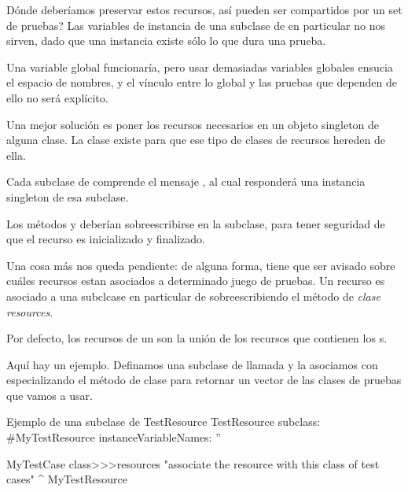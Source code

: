 \documentclass[a4paper,10pt,twoside]{book}
\begin{document}
D\'onde deber\'iamos preservar estos recursos, as\'i pueden ser compartidos por un set de pruebas?
Las variables de instancia de una subclase de  en particular no nos sirven, dado que una instancia
existe s\'olo lo que dura una prueba.

Una variable global funcionar\'ia, pero usar demasiadas variables globales ensucia el espacio de nombres,
y el v\'inculo entre lo global y las pruebas que dependen de ello no ser\'a expl\'icito. 

Una mejor soluci\'on es poner los recursos necesarios en un objeto singleton de alguna clase.
La clase  existe para que ese tipo de clases de recursos hereden de ella.

Cada subclase de   comprende el mensaje , al cual responder\'a una instancia singleton de esa subclase.

Los m\'etodos  y  deber\'ian sobreescribirse en la subclase, para tener seguridad de que el
recurso es inicializado y finalizado. 

Una cosa m\'as nos queda pendiente: de alguna forma, \sunit tiene que ser avisado sobre cu\'ales recursos
estan asociados a determinado juego de pruebas.
Un recurso es asociado a una subclcase en particular de  sobreescribiendo el m\'etodo de \emph{clase}
\emph{resources}.


Por defecto, los recursos de un  son la uni\'on de los recursos que contienen los 
s. 

Aqu\'i hay un ejemplo.
Definamos una subclase de  llamada  y la asociamos con 
especializando el m\'etodo de clase  para retornar un vector de las clases de pruebas que vamos 
a usar.

\begin{classdef}[mytestresource]{Ejemplo de una subclase de TestResource}
TestResource subclass: #MyTestResource
	instanceVariableNames: ''

MyTestCase class>>>resources
	"associate the resource with this class of test cases"
	^{ MyTestResource }
\end{classdef}
\end{document}

